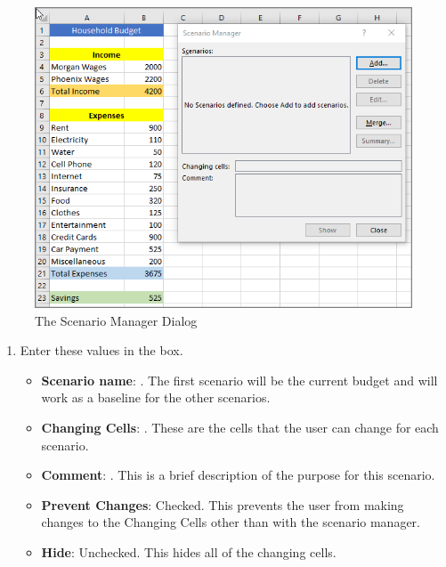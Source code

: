 \begin{figure}[H]
	\centering
	\includegraphics[width=\maxwidth{.95\linewidth}]{gfx/ch08_fig23}
	\caption{The Scenario Manager Dialog}
	\label{08:fig23}
\end{figure}

\begin{enumerate}[resume]	
	
	\item Enter these values in the  box.
	
	\begin{itemize}
		\item \textbf{Scenario name}: . The first scenario will be the current budget and will work as a baseline for the other scenarios.
		\item \textbf{Changing Cells}: . These are the cells that the user can change for each scenario.
		\item \textbf{Comment}: . This is a brief description of the purpose for this scenario.
		\item \textbf{Prevent Changes}: Checked. This prevents the user from making changes to the Changing Cells other than with the scenario manager.
		\item \textbf{Hide}: Unchecked. This hides all of the changing cells.
	\end{itemize}

\end{enumerate}

